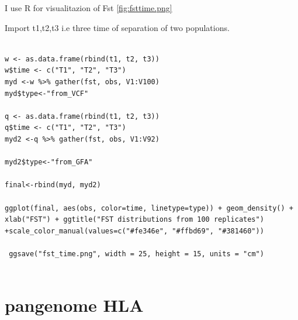 I use R for visualitazion of Fst \ref{fig:fsttime.png}

Import t1,t2,t3 i.e three time of separation of two populations.

\begin{verbatim}

w <- as.data.frame(rbind(t1, t2, t3))
w$time <- c("T1", "T2", "T3")
myd <-w %>% gather(fst, obs, V1:V100)
myd$type<-"from_VCF"

q <- as.data.frame(rbind(t1, t2, t3))
q$time <- c("T1", "T2", "T3")
myd2 <-q %>% gather(fst, obs, V1:V92)

myd2$type<-"from_GFA"

final<-rbind(myd, myd2)

ggplot(final, aes(obs, color=time, linetype=type)) + geom_density() + xlab("FST") + ggtitle("FST distributions from 100 replicates") +scale_color_manual(values=c("#fe346e", "#ffbd69", "#381460"))

 ggsave("fst_time.png", width = 25, height = 15, units = "cm")
 
\end{verbatim}

\section{pangenome HLA}

